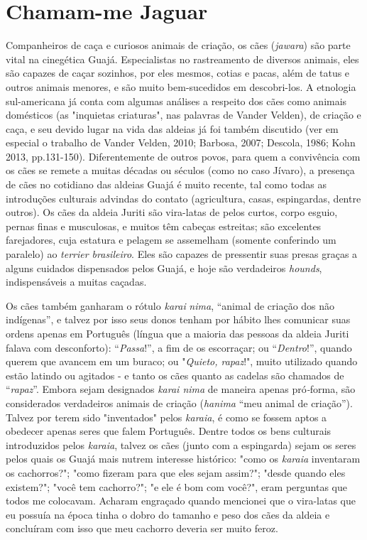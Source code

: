 \section{Chamam-me Jaguar}\label{chamam-me-jaguar}

Companheiros de caça e curiosos animais de criação, os cães
(\emph{jawara}) são parte vital na cinegética Guajá. Especialistas no
rastreamento de diversos animais, eles são capazes de caçar sozinhos,
por eles mesmos, cotias e pacas, além de tatus e outros animais menores,
e são muito bem-sucedidos em descobri-los. A etnologia sul-americana já
conta com algumas análises a respeito dos cães como animais domésticos
(as "inquietas criaturas", nas palavras de Vander Velden), de criação e
caça, e seu devido lugar na vida das aldeias já foi também discutido
(ver em especial o trabalho de Vander Velden, 2010; Barbosa, 2007;
Descola, 1986; Kohn 2013, pp.131-150). Diferentemente de outros povos,
para quem a convivência com os cães se remete a muitas décadas ou
séculos (como no caso Jívaro), a presença de cães no cotidiano das
aldeias Guajá é muito recente, tal como todas as introduções culturais
advindas do contato (agricultura, casas, espingardas, dentre outros). Os
cães da aldeia Juriti são vira-latas de pelos curtos, corpo esguio,
pernas finas e musculosas, e muitos têm cabeças estreitas; são
excelentes farejadores, cuja estatura e pelagem se assemelham (somente
conferindo um paralelo) ao \emph{terrier brasileiro}. Eles são capazes
de pressentir suas presas graças a alguns cuidados dispensados pelos
Guajá, e hoje são verdadeiros \emph{hounds}, indispensáveis a muitas
caçadas.

Os cães também ganharam o rótulo \emph{karai} \emph{nima}, ``animal de
criação dos não indígenas'', e talvez por isso seus donos tenham por
hábito lhes comunicar suas ordens apenas em Português (língua que a
maioria das pessoas da aldeia Juriti falava com desconforto):
``\emph{Passa}!'', a fim de os escorraçar; ou ``\emph{Dentro}!'', quando
querem que avancem em um buraco; ou "\emph{Quieto, rapaz}!", muito
utilizado quando estão latindo ou agitados - e tanto os cães quanto as
cadelas são chamados de ``\emph{rapaz}''. Embora sejam designados
\emph{karai nima} de maneira apenas pró\emph{-}forma, são considerados
verdadeiros animais de criação (\emph{hanima} ``meu animal de
criação''). Talvez por terem sido "inventados" pelos \emph{karaia}, é
como se fossem aptos a obedecer apenas seres que falem Português. Dentre
todos os bens culturais introduzidos pelos \emph{karaia}, talvez os cães
(junto com a espingarda) sejam os seres pelos quais os Guajá mais nutrem
interesse histórico: "como os \emph{karaia} inventaram os cachorros?";
"como fizeram para que eles sejam assim?"; "desde quando eles existem?";
"você tem cachorro?"; "e ele é bom com você?", eram perguntas que todos
me colocavam. Acharam engraçado quando mencionei que o vira-latas que eu
possuía na época tinha o dobro do tamanho e peso dos cães da aldeia e
concluíram com isso que meu cachorro deveria ser muito feroz.

